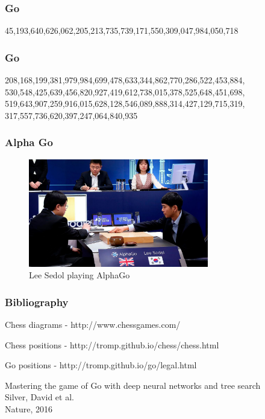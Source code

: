 \documentclass{beamer}
\begin{document}
\begin{frame} %
\frametitle{Go}
45,193,640,626,062,205,213,735,739,171,550,309,047,984,050,718 \cite{chesspositions}
\end{frame}

\begin{frame} %
\frametitle{Go}
208,168,199,381,979,984,699,478,633,344,862,770,286,522,453,884,\\
530,548,425,639,456,820,927,419,612,738,015,378,525,648,451,698,\\
519,643,907,259,916,015,628,128,546,089,888,314,427,129,715,319,\\
317,557,736,620,397,247,064,840,935 \cite{gopositions}
\end{frame}

\begin{frame} %
\frametitle{Alpha Go}
\begin{figure}
	\centering
	\includegraphics[width=0.7\textwidth]{images/alphagomatch.jpg}
	\caption{Lee Sedol playing AlphaGo}
	\label{alphagomatch}
\end{figure}
\end{frame}

\begin{frame} %
\frametitle{Bibliography}
\begin{thebibliography}{9}
	Chess diagrams - http://www.chessgames.com/

	Chess positions - http://tromp.github.io/chess/chess.html

	Go positions - http://tromp.github.io/go/legal.html

	Mastering the game of Go with deep neural networks and tree search\\
	Silver, David et al.\\
	Nature, 2016
\end{thebibliography}
\end{frame}
\end{document}
